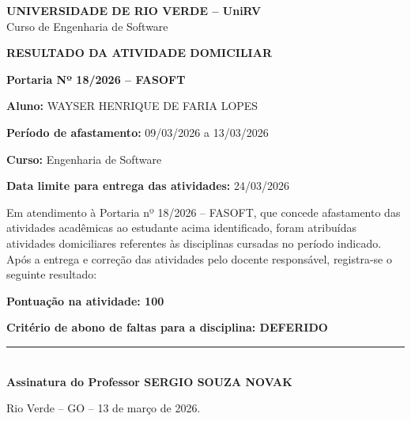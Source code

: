 \documentclass[12pt,a4paper]{article}
\begin{document}
\begin{center}

\textbf{UNIVERSIDADE DE RIO VERDE -- UniRV}\\
Curso de Engenharia de Software

\vspace{1cm}

\textbf{RESULTADO DA ATIVIDADE DOMICILIAR}

\vspace{0.5cm}

\textbf{Portaria Nº 18/2026 -- FASOFT}

\end{center}

\vspace{1cm}

\noindent
\textbf{Aluno:} WAYSER HENRIQUE DE FARIA LOPES

\vspace{0.4cm}

\noindent
\textbf{Período de afastamento:} 09/03/2026 a 13/03/2026

\vspace{0.4cm}

\noindent
\textbf{Curso:} Engenharia de Software

\vspace{0.4cm}

\noindent
\textbf{Data limite para entrega das atividades:} 24/03/2026

\vspace{0.8cm}

\noindent
Em atendimento à Portaria nº 18/2026 -- FASOFT, que concede afastamento das atividades acadêmicas ao estudante acima identificado, foram atribuídas atividades domiciliares referentes às disciplinas cursadas no período indicado. Após a entrega e correção das atividades pelo docente responsável, registra-se o seguinte resultado:

\vspace{1cm}

\begin{center}

\Large
\textbf{Pontuação na atividade: 100}

\vspace{0.5cm}

\textbf{Critério de abono de faltas para a disciplina: DEFERIDO}

\end{center}

\vspace{2cm}

\begin{center}


\vspace{2cm}

\rule{8cm}{0.4pt}\\
\textbf{Assinatura do Professor SERGIO SOUZA NOVAK}

\vspace{1cm}

Rio Verde -- GO -- 13 de março de 2026.

\end{center}
\end{document}
